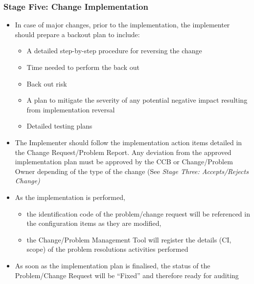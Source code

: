 \documentclass{template/openetcs_article}
\begin{document}
\subsubsection{Stage Five: Change Implementation}
\begin{itemize}
\item In case of major changes, prior to the implementation, the implementer should prepare a backout plan to include:
\begin{itemize}
\item A detailed step-by-step procedure for reversing the change
\item Time needed to perform the back out
\item Back out risk
\item A plan to mitigate the severity of any potential negative impact resulting from implementation reversal
\item Detailed testing plans
\end{itemize}
\item The Implementer should follow the implementation action items detailed in the Change Request/Problem Report. Any deviation from the approved implementation plan must be approved by the CCB or Change/Problem Owner depending of the type of the change (See {\it{Stage Three: Accepts/Rejects Change})}
\item As the implementation is performed,
\begin{itemize}
\item the identification code of the problem/change request will be referenced in the configuration items as they are modified, 
\item the Change/Problem Management Tool will register the details (CI, scope) of the problem resolutions activities performed
\end{itemize}
\item As soon as the implementation plan is finalised, the status of the Problem/Change Request will be “Fixed” and therefore ready for auditing
\end{itemize}
\end{document}
